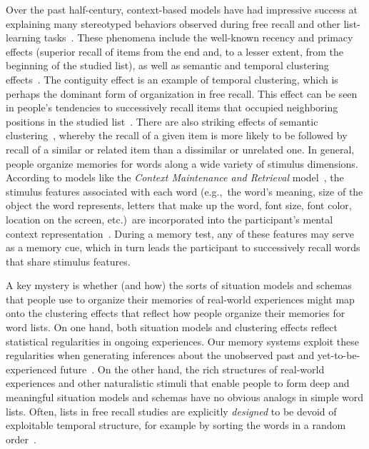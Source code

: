 \documentclass[11pt]{article}
\begin{document}
Over the past half-century, context-based models have had impressive success at
explaining many stereotyped behaviors observed during free recall and other
list-learning tasks~\citep{Este55a, RaaiShif80, GlenEtal83, HowaKaha02a,
SiroEtal05, KimbEtal07, PolyKaha08, SedeEtal08, PolyEtal09, ShanHowa12}. These
phenomena include the well-known recency and primacy effects (superior recall
of items from the end and, to a lesser extent, from the beginning of the studied
list), as well as semantic and temporal clustering effects~\citep{KahaEtal08b,
HowaKaha02b}. The contiguity effect is an example of temporal clustering, which
is perhaps the dominant form of organization in free recall. This effect can be
seen in people's tendencies to successively recall items that occupied
neighboring positions in the studied list~\citep{Kaha96}. There are also
striking effects of semantic clustering~\citep{RomnEtal93, Bous53, BousEtal54,
JenkRuss52, MannKaha12}, whereby the recall of a given item is more likely to
be followed by recall of a similar or related item than a dissimilar or
unrelated one. In general, people organize memories for words along a wide
variety of stimulus dimensions. According to models like the
\textit{Context Maintenance and Retrieval} model~\citep{PolyEtal09}, the
stimulus features associated with each word (e.g.,\ the word's meaning, size of
the object the word represents, letters that make up the word, font size,
font color, location on the screen, etc.)~are incorporated into the
participant's mental context representation~\citep{SmitVela01, MannEtal11,
MannEtal12, MannEtal15, Mann20}. During a memory test, any of these features
may serve as a memory cue, which in turn leads the participant to successively recall
words that share stimulus features.


A key mystery is whether (and how) the sorts of situation models and schemas
that people use to organize their memories of real-world experiences might map
onto the clustering effects that reflect how people organize their memories for
word lists. On one hand, both situation models and clustering effects reflect
statistical regularities in ongoing experiences. Our memory systems exploit
these regularities when generating inferences about the unobserved past and
yet-to-be-experienced future~\citep{XuEtal23, SchaTurk15, RangRitc12,
BoweEtal79, MomeEtal17}. On the other hand, the rich structures of real-world
experiences and other naturalistic stimuli that enable people to form deep and
meaningful situation models and schemas have no obvious analogs in simple word
lists. Often, lists in free recall studies are explicitly \textit{designed} to
be devoid of exploitable temporal structure, for example by sorting the words
in a random order~\citep{Kaha12}.
\end{document}
